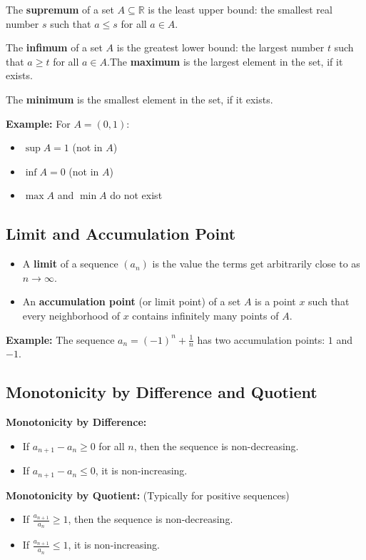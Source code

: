 The \textbf{supremum} of a set \(A \subseteq \mathbb{R}\) is the least upper bound: the smallest real number \(s\) such that \(a \le s\) for all \(a \in A\).

The \textbf{infimum} of a set \(A\) is the greatest lower bound: the largest number \(t\) such that \(a \ge t\) for all \(a \in A\).The \textbf{maximum} is the largest element in the set, if it exists.

The \textbf{minimum} is the smallest element in the set, if it exists.

\textbf{Example:} For \(A = (0,1)\):
\begin{itemize}[label=\(-\)]
\item \(\sup A = 1\) (not in \(A\))
\item \(\inf A = 0\) (not in \(A\))
\item \(\max A\) and \(\min A\) do not exist
\end{itemize}

\subsection{Limit and Accumulation Point}

\begin{itemize}[label=\(-\)]
\item A \textbf{limit} of a sequence \((a_n)\) is the value the terms get arbitrarily close to as \(n \to \infty\).
\item An \textbf{accumulation point} (or limit point) of a set \(A\) is a point \(x\) such that every neighborhood of \(x\) contains infinitely many points of \(A\).
\end{itemize}

\textbf{Example:} The sequence \(a_n = (-1)^n + \frac{1}{n}\) has two accumulation points: \(1\) and \(-1\).

\subsection{Monotonicity by Difference and Quotient}

\textbf{Monotonicity by Difference:}
\begin{itemize}[label=\(-\)]
\item If \(a_{n+1} - a_n \ge 0\) for all \(n\), then the sequence is non-decreasing.
\item If \(a_{n+1} - a_n \le 0\), it is non-increasing.
\end{itemize}

\textbf{Monotonicity by Quotient:} (Typically for positive sequences)
\begin{itemize}[label=\(-\)]
\item If \(\frac{a_{n+1}}{a_n} \ge 1\), then the sequence is non-decreasing.
\item If \(\frac{a_{n+1}}{a_n} \le 1\), it is non-increasing.
\end{itemize}

